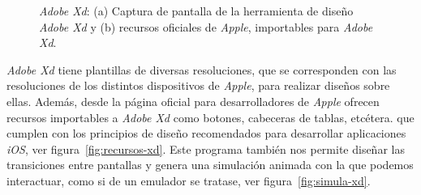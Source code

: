 \begin{figure}[p]
\centering
{}
\caption{\textit{Adobe Xd}: (a) Captura de pantalla de la herramienta de diseño \textit{Adobe Xd} y (b) recursos oficiales de \textit{Apple}, importables para \textit{Adobe Xd}.}
\end{figure}

\textit{Adobe Xd} tiene plantillas de diversas resoluciones, que se corresponden con las resoluciones de los distintos dispositivos de \textit{Apple}, para realizar diseños sobre ellas. Además, desde la página oficial para desarrolladores de \textit{Apple} ofrecen recursos importables a \textit{Adobe Xd} \cite{noauthor_apple_nodate} como botones, cabeceras de tablas, etcétera. que cumplen con los principios de diseño recomendados para desarrollar aplicaciones \textit{iOS}, ver figura~\ref{fig:recursos-xd}.
Este programa también nos permite diseñar las transiciones entre pantallas y genera una simulación animada con la que podemos interactuar, como si de un emulador se tratase, ver figura~\ref{fig:simula-xd}.

